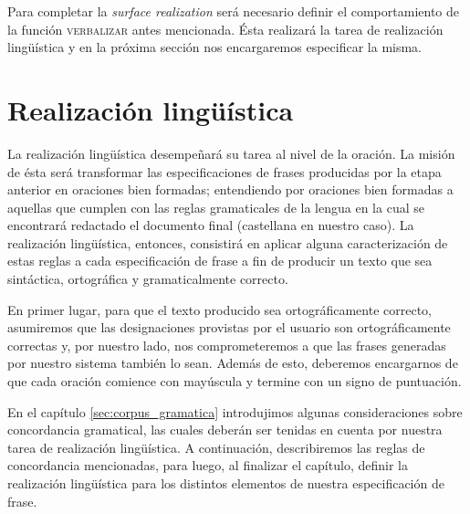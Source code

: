 Para completar la \textit{surface realization} será necesario definir el comportamiento de la función \textsc{verbalizar} antes mencionada. Ésta realizará la tarea de realización lingüística y en la próxima sección nos encargaremos especificar la misma.





\section{Realización lingüística}
\label{cap:linguistic_realization}

La realización lingüística desempeñará su tarea al nivel de la oración. La misión de ésta será transformar las especificaciones de frases producidas por la etapa anterior en oraciones bien formadas; entendiendo por oraciones bien formadas a aquellas que cumplen con las reglas gramaticales de la lengua en la cual se encontrará redactado el documento final (castellana en nuestro caso). La realización lingüística, entonces, consistirá en aplicar alguna caracterización de estas reglas a cada especificación de frase a fin de producir un texto que sea sintáctica, ortográfica y gramaticalmente correcto.

En primer lugar, para que el texto producido sea ortográficamente correcto, asumiremos que las designaciones provistas por el usuario son ortográficamente correctas y, por nuestro lado, nos comprometeremos a que las frases generadas por nuestro sistema también lo sean. Además de esto, deberemos encargarnos de que cada oración comience con mayúscula y termine con un signo de puntuación.

En el capítulo \ref{sec:corpus_gramatica} introdujimos algunas consideraciones sobre concordancia gramatical, las cuales deberán ser tenidas en cuenta por nuestra tarea de realización lingüística. A continuación, describiremos las reglas de concordancia mencionadas, para luego, al finalizar el capítulo, definir la realización lingüística para los distintos elementos de nuestra especificación de frase.

